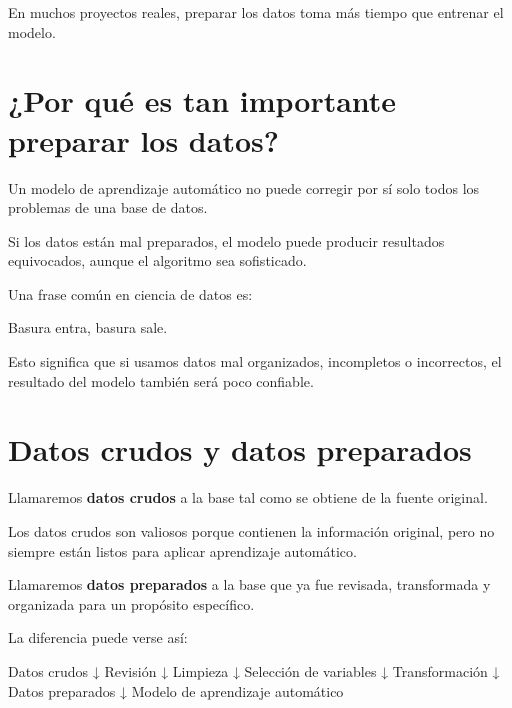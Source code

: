 \documentclass[
  11pt,
  letterpaper,
]{book}
\newenvironment{Shaded}{\begin{snugshade}}{\end{snugshade}}
\newcommand{\NormalTok}[1]{\textcolor[rgb]{0.00,0.23,0.31}{#1}}
\begin{document}
En muchos proyectos reales, preparar los datos toma más tiempo que
entrenar el modelo.

\section{¿Por qué es tan importante preparar los
datos?}\label{por-quuxe9-es-tan-importante-preparar-los-datos}

Un modelo de aprendizaje automático no puede corregir por sí solo todos
los problemas de una base de datos.

Si los datos están mal preparados, el modelo puede producir resultados
equivocados, aunque el algoritmo sea sofisticado.

Una frase común en ciencia de datos es:

\begin{Shaded}
\begin{Highlighting}[]
\NormalTok{Basura entra, basura sale.}
\end{Highlighting}
\end{Shaded}

Esto significa que si usamos datos mal organizados, incompletos o
incorrectos, el resultado del modelo también será poco confiable.

\section{Datos crudos y datos
preparados}\label{datos-crudos-y-datos-preparados}

Llamaremos \textbf{datos crudos} a la base tal como se obtiene de la
fuente original.

Los datos crudos son valiosos porque contienen la información original,
pero no siempre están listos para aplicar aprendizaje automático.

Llamaremos \textbf{datos preparados} a la base que ya fue revisada,
transformada y organizada para un propósito específico.

La diferencia puede verse así:

\begin{Shaded}
\begin{Highlighting}[]
\NormalTok{Datos crudos}
\NormalTok{    ↓}
\NormalTok{Revisión}
\NormalTok{    ↓}
\NormalTok{Limpieza}
\NormalTok{    ↓}
\NormalTok{Selección de variables}
\NormalTok{    ↓}
\NormalTok{Transformación}
\NormalTok{    ↓}
\NormalTok{Datos preparados}
\NormalTok{    ↓}
\NormalTok{Modelo de aprendizaje automático}
\end{Highlighting}
\end{Shaded}
\end{document}
